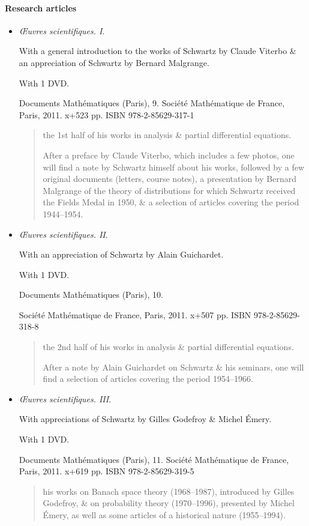 \documentclass{article}
\begin{document}
\paragraph{Research articles}
\begin{itemize}
	\item \textit{Œuvres scientifiques. I}.
	
	With a general introduction to the works of Schwartz by Claude Viterbo \& an appreciation of Schwartz by Bernard Malgrange.
	
	With 1 DVD.
	
	Documents Mathématiques (Paris), 9. Société Mathématique de France, Paris, 2011. x+523 pp. ISBN 978-2-85629-317-1
	\begin{quotation}
		the 1st half of his works in analysis \& partial differential equations.
		
		After a preface by Claude Viterbo, which includes a few photos, one will find a note by Schwartz himself about his works, followed by a few original documents (letters, course notes), a presentation by Bernard Malgrange of the theory of distributions for which Schwartz received the Fields Medal in 1950, \& a selection of articles covering the period 1944--1954.
	\end{quotation}
	\item \textit{Œuvres scientifiques. II}.
	
	With an appreciation of Schwartz by Alain Guichardet.
	
	With 1 DVD.
	
	Documents Mathématiques (Paris), 10.
	
	Société Mathématique de France, Paris, 2011. x+507 pp. ISBN 978-2-85629-318-8
	\begin{quotation}
		the 2nd half of his works in analysis \& partial differential equations.
		
		After a note by Alain Guichardet on Schwartz \& his seminars, one will find a selection of articles covering the period 1954--1966.
	\end{quotation}
	\item \textit{Œuvres scientifiques. III}.
	
	With appreciations of Schwartz by Gilles Godefroy \& Michel Émery.
	
	With 1 DVD.
	
	Documents Mathématiques (Paris), 11. Société Mathématique de France, Paris, 2011. x+619 pp. ISBN 978-2-85629-319-5
	\begin{quotation}
		his works on Banach space theory (1968--1987), introduced by Gilles Godefroy, \& on probability theory (1970--1996), presented by Michel Émery, as well as some articles of a historical nature (1955--1994).
	\end{quotation}
\end{itemize}
\end{document}
